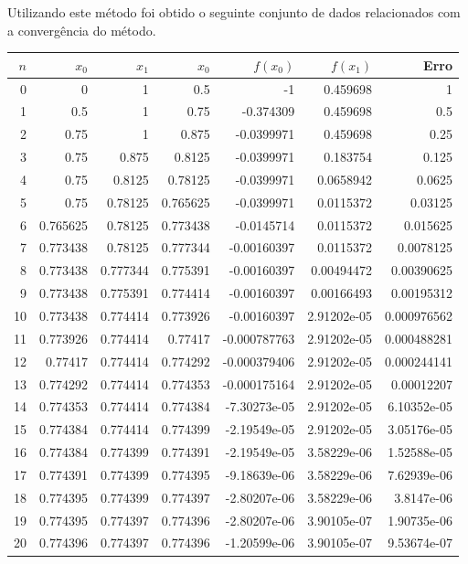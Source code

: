 \documentclass[twoside]{amsart}
\numberwithin{equation}{section}
\begin{document}
Utilizando este método foi obtido o seguinte conjunto de dados 
relacionados com a convergência do método.

\centering
{
    \begin{tabular}{rrrrrrr}
        \hline
           $n$ &   $x_0$ &   $x_1$ &   $x_0$ &   $f(x_0)$ &   $f(x_1)$ &        Erro \\
        \hline
           0 &   0        & 1        & 0.5      &  -1           & 0.459698    & 1           \\
           1 &   0.5      & 1        & 0.75     &  -0.374309    & 0.459698    & 0.5         \\
           2 &   0.75     & 1        & 0.875    &  -0.0399971   & 0.459698    & 0.25        \\
           3 &   0.75     & 0.875    & 0.8125   &  -0.0399971   & 0.183754    & 0.125       \\
           4 &   0.75     & 0.8125   & 0.78125  &  -0.0399971   & 0.0658942   & 0.0625      \\
           5 &   0.75     & 0.78125  & 0.765625 &  -0.0399971   & 0.0115372   & 0.03125     \\
           6 &   0.765625 & 0.78125  & 0.773438 &  -0.0145714   & 0.0115372   & 0.015625    \\
           7 &   0.773438 & 0.78125  & 0.777344 &  -0.00160397  & 0.0115372   & 0.0078125   \\
           8 &   0.773438 & 0.777344 & 0.775391 &  -0.00160397  & 0.00494472  & 0.00390625  \\
           9 &   0.773438 & 0.775391 & 0.774414 &  -0.00160397  & 0.00166493  & 0.00195312  \\
          10 &   0.773438 & 0.774414 & 0.773926 &  -0.00160397  & 2.91202e-05 & 0.000976562 \\
          11 &   0.773926 & 0.774414 & 0.77417  &  -0.000787763 & 2.91202e-05 & 0.000488281 \\
          12 &   0.77417  & 0.774414 & 0.774292 &  -0.000379406 & 2.91202e-05 & 0.000244141 \\
          13 &   0.774292 & 0.774414 & 0.774353 &  -0.000175164 & 2.91202e-05 & 0.00012207  \\
          14 &   0.774353 & 0.774414 & 0.774384 &  -7.30273e-05 & 2.91202e-05 & 6.10352e-05 \\
          15 &   0.774384 & 0.774414 & 0.774399 &  -2.19549e-05 & 2.91202e-05 & 3.05176e-05 \\
          16 &   0.774384 & 0.774399 & 0.774391 &  -2.19549e-05 & 3.58229e-06 & 1.52588e-05 \\
          17 &   0.774391 & 0.774399 & 0.774395 &  -9.18639e-06 & 3.58229e-06 & 7.62939e-06 \\
          18 &   0.774395 & 0.774399 & 0.774397 &  -2.80207e-06 & 3.58229e-06 & 3.8147e-06  \\
          19 &   0.774395 & 0.774397 & 0.774396 &  -2.80207e-06 & 3.90105e-07 & 1.90735e-06 \\
          20 &   0.774396 & 0.774397 & 0.774396 &  -1.20599e-06 & 3.90105e-07 & 9.53674e-07 \\
        \hline
        \end{tabular}
}
\end{document}
